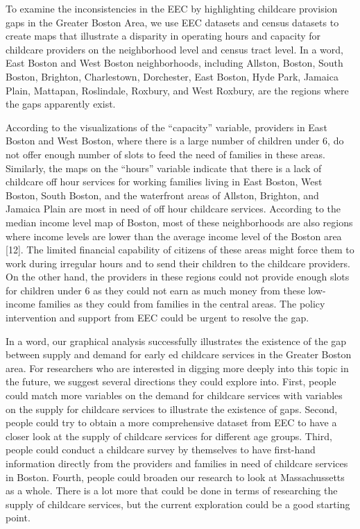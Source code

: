\documentclass[10pt,letterpaper]{article}
\begin{document}
To examine the inconsistencies in the EEC by highlighting childcare
provision gaps in the Greater Boston Area, we use EEC datasets and
census datasets to create maps that illustrate a disparity in operating
hours and capacity for childcare providers on the neighborhood level and
census tract level. In a word, East Boston and West Boston
neighborhoods, including Allston, Boston, South Boston, Brighton,
Charlestown, Dorchester, East Boston, Hyde Park, Jamaica Plain,
Mattapan, Roslindale, Roxbury, and West Roxbury, are the regions where
the gaps apparently exist.

According to the visualizations of the ``capacity'' variable, providers
in East Boston and West Boston, where there is a large number of
children under 6, do not offer enough number of slots to feed the need
of families in these areas. Similarly, the maps on the ``hours''
variable indicate that there is a lack of childcare off hour services
for working families living in East Boston, West Boston, South Boston,
and the waterfront areas of Allston, Brighton, and Jamaica Plain are
most in need of off hour childcare services. According to the median
income level map of Boston, most of these neighborhoods are also regions
where income levels are lower than the average income level of the
Boston area {[}12{]}. The limited financial capability of citizens of
these areas might force them to work during irregular hours and to send
their children to the childcare providers. On the other hand, the
providers in these regions could not provide enough slots for children
under 6 as they could not earn as much money from these low-income
families as they could from families in the central areas. The policy
intervention and support from EEC could be urgent to resolve the gap.

In a word, our graphical analysis successfully illustrates the existence
of the gap between supply and demand for early ed childcare services in
the Greater Boston area. For researchers who are interested in digging
more deeply into this topic in the future, we suggest several directions
they could explore into. First, people could match more variables on the
demand for childcare services with variables on the supply for childcare
services to illustrate the existence of gaps. Second, people could try
to obtain a more comprehensive dataset from EEC to have a closer look at
the supply of childcare services for different age groups. Third, people
could conduct a childcare survey by themselves to have first-hand
information directly from the providers and families in need of
childcare services in Boston. Fourth, people could broaden our research
to look at Massachussetts as a whole. There is a lot more that could be
done in terms of researching the supply of childcare services, but the
current exploration could be a good starting point.
\end{document}
